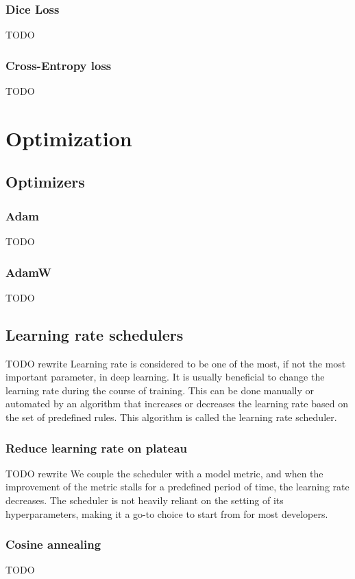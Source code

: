\subsubsection{Dice Loss}
TODO

\subsubsection{Cross-Entropy loss}
TODO


\section{Optimization}
\subsection{Optimizers}
\subsubsection{Adam}
TODO
\subsubsection{AdamW}
TODO

\subsection{Learning rate schedulers}
TODO rewrite Learning rate is considered to be one of the most, if not the most important parameter, in deep learning. It is usually beneficial to change the learning rate during the course of training. This can be done manually or automated by an algorithm that increases or decreases the learning rate based on the set of predefined rules. This algorithm is called the learning rate scheduler.

\subsubsection{Reduce learning rate on plateau}
TODO rewrite We couple the scheduler with a model metric, and when the improvement of the metric stalls for a predefined period of time, the learning rate decreases.
The scheduler is not heavily reliant on the setting of its hyperparameters, making it a go-to choice to start from for most developers.
\subsubsection{Cosine annealing}
TODO

